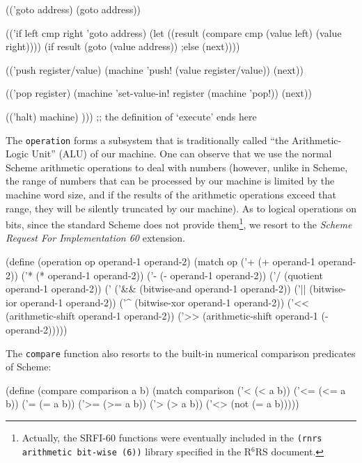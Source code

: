 \begin{Snippet}
      (('goto address)
       (goto address))
\end{Snippet}
\begin{Snippet}
      (('if left cmp right 'goto address)
       (let ((result (compare cmp (value left) (value right))))
	 (if result
	     (goto (value address))
         ;else
             (next))))
\end{Snippet}
\begin{Snippet}
      (('push register/value)
       (machine 'push! (value register/value))
       (next))
\end{Snippet}
\begin{Snippet}
      (('pop register)
       (machine 'set-value-in! register (machine 'pop!))
       (next))
\end{Snippet}
\begin{Snippet}
      (('halt)
       machine)
      ))) ;; the definition of `execute' ends here
\end{Snippet}

The \texttt{operation} forms a subsystem that is traditionally
called ``the Arith\-metic-Logic Unit'' (ALU) of our machine.
One can observe that we use the normal
Scheme arithmetic operations to deal with numbers (however, unlike
in Scheme, the range of numbers that can be processed by our machine
is limited by the machine word size, and if the results of the
arithmetic operations exceed that range, they will be silently
truncated by our machine). As to logical operations on bits, since
the standard Scheme does not provide them\footnote{Actually, the
  SRFI-60 functions were eventually included in the \texttt{(rnrs arithmetic
    bit-wise (6))} library specified in the R$^6$RS document\cite{R6RS}.},
we resort to the \textit{Scheme Request For Implementation 60}
extension\cite{SRFI-60}.

\begin{Snippet}
(define (operation op operand-1 operand-2)
  (match op
    ('+ (+ operand-1 operand-2))
    ('* (* operand-1 operand-2))
    ('- (- operand-1 operand-2))
    ('/ (quotient operand-1 operand-2))
    ('%
    ('&& (bitwise-and operand-1 operand-2))
    ('|| (bitwise-ior operand-1 operand-2))
    ('^ (bitwise-xor operand-1 operand-2))
    ('<< (arithmetic-shift operand-1 operand-2))
    ('>> (arithmetic-shift operand-1 (- operand-2)))))
\end{Snippet}
The \texttt{compare} function also resorts to the built-in
numerical comparison predicates of Scheme:
\begin{Snippet}
(define (compare comparison a b)
  (match comparison
    ('< (< a b))
    ('<= (<= a b))
    ('= (= a b))
    ('>= (>= a b))
    ('> (> a b))
    ('<> (not (= a b)))))
\end{Snippet}

